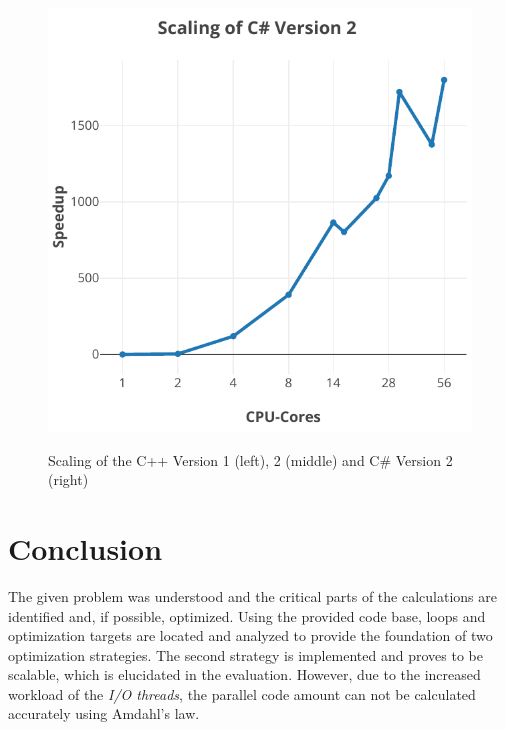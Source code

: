 \begin{figure}[bt]
{        \includegraphics[width=0.32\paperwidth]{mandelbrot/assets/mandelbrot-cs-scaling.pdf}
    }
    \caption{Scaling of the C++ Version 1 (left), 2 (middle) and C\# Version 2 (right)}
    \label{fig:scaling}
\end{figure}


\section{Conclusion}
\label{sec:conclusion}

The given problem was understood and the critical parts of the \ms{} calculations are identified and, if possible, optimized. Using the provided code base, loops and optimization targets are located and analyzed to provide the foundation of two optimization strategies. The second strategy is implemented and proves to be scalable, which is elucidated in the evaluation. However, due to the increased workload of the \textit{I/O threads}, the parallel code amount can not be calculated accurately using Amdahl's law.


